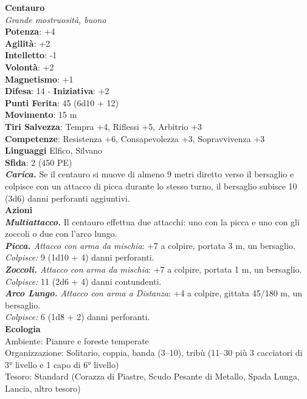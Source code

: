 \begin{multicols}{2}
\medskip\textbf{Centauro}\\
\emph{Grande mostruosità, buono}\\
\textbf{Potenza}: +4\\
\textbf{Agilità}: +2\\
\textbf{Intelletto}: -1\\
\textbf{Volontà}: +2\\
\textbf{Magnetismo}: +1\\
\textbf{Difesa}: 14 - \textbf{Iniziativa}: +2\\
\textbf{Punti Ferita}: 45 (6d10 + 12)\\
\textbf{Movimento}: 15 m\\
\textbf{Tiri Salvezza}: Tempra +4, Riflessi +5, Arbitrio +3\\
\textbf{Competenze}: Resistenza +6, Consapevolezza +3, Sopravvivenza +3\\
\textbf{Linguaggi} Elfico, Silvano\\
\textbf{Sfida}: 2 (450 PE)\smallskip\\
\emph{\textbf{Carica.}} Se il centauro si muove di almeno 9 metri diretto verso il bersaglio e colpisce con un attacco di picca durante lo stesso turno, il bersaglio subisce 10 (3d6) danni perforanti aggiuntivi. \\
\smallskip\textbf{Azioni}\\
\emph{\textbf{Multiattacco.}} Il centauro effettua due attacchi: uno con la picca e uno con gli zoccoli o due con l'arco lungo.\\
\emph{\textbf{Picca.} Attacco con arma da mischia}: +7 a colpire, portata 3 m, un bersaglio.\\
\emph{Colpisce:} 9 (1d10 + 4) danni perforanti.\\
\emph{\textbf{Zoccoli.} Attacco con arma da mischia}: +7 a colpire, portata 1 m, un bersaglio.\\
\emph{Colpisce:} 11 (2d6 + 4) danni contundenti.\\
\emph{\textbf{Arco Lungo.} Attacco con arma a Distanza}: +4 a colpire, gittata 45/180 m, un bersaglio.\\
\emph{Colpisce:} 6 (1d8 + 2) danni perforanti.\\
\textbf{Ecologia}\\
Ambiente: Pianure e foreste temperate\\
Organizzazione: Solitario, coppia, banda (3–10), tribù (11–30 più 3 cacciatori di 3° livello e 1 capo di 6° livello)\\
Tesoro: Standard (Corazza di Piastre, Scudo Pesante di Metallo, Spada Lunga, Lancia, altro tesoro)\\

\end{multicols}
